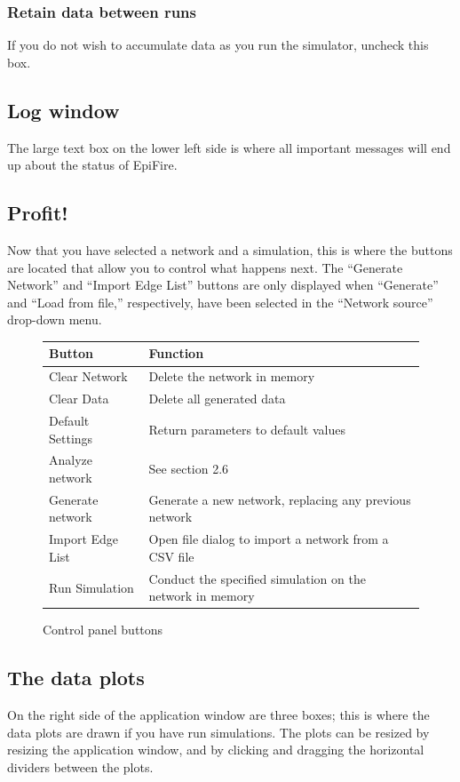 \documentclass{article}
\begin{document}
\subsubsection{Retain data between runs}
If you do not wish to accumulate data as you run the simulator, uncheck this box.

\subsection{Log window}
The large text box on the lower left side is where all important messages will end up about the status of EpiFire.


\subsection{Profit!}
Now that you have selected a network and a simulation, this is where the buttons are located that allow you to control what happens next. The ``Generate Network'' and ``Import Edge List'' buttons are only displayed when ``Generate'' and ``Load from file,'' respectively, have been selected in the ``Network source'' drop-down menu.

\UndefineShortVerb{\|}
\begin{figure}[h]
\begin{center}
\begin{tabular}{|l|l|}
\hline
Button & Function \\ \hline
Clear Network & Delete the network in memory\\ 
Clear Data & Delete all generated data\\ 
Default Settings & Return parameters to default values\\ 
Analyze network & See section 2.6\\ 
Generate network & Generate a new network, replacing any previous network\\ 
Import Edge List & Open file dialog to import a network from a CSV file\\ 
Run Simulation & Conduct the specified simulation on the network in memory\\ 
\hline
\end{tabular}
\caption{Control panel buttons}
\end{center}
\end{figure}
\DefineShortVerb{\|}


\subsection{The data plots}
On the right side of the application window are three boxes; this is where the data plots are drawn if you have run simulations.  The plots can be resized by resizing the application window, and by clicking and dragging the horizontal dividers between the plots.
\end{document}
